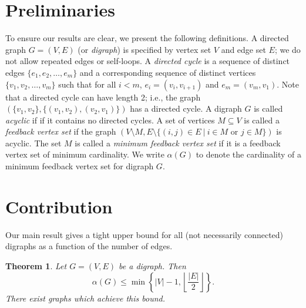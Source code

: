 \documentclass[journal,12pt,onecolumn]{IEEETran}  %
\newtheorem{theorem}{Theorem}[section]
\begin{document}
\section{Preliminaries}
To ensure our results are clear, we present the following definitions.
A directed graph $G=(V,E)$ (or \emph{digraph}) is specified by vertex set $V$ and edge set $E$; we do not allow repeated edges or self-loops.
A \emph{directed cycle} is a sequence of distinct edges $\{e_1,e_2,\ldots,e_m\}$ and a corresponding sequence of distinct vertices $\{v_1,v_2,\ldots,v_m\}$ such that for all $i<m$, $e_i=(v_i,v_{i+1})$ and $e_m=(v_m,v_1)$.
Note that a directed cycle can have length 2; i.e., the graph $(\{v_1,v_2\},\{(v_1,v_2),(v_2,v_1)\})$ has a directed cycle.
A digraph $G$ is called \emph{acyclic} if if it contains no directed cycles.
A set of vertices $M\subseteq V$ is called a \emph{feedback vertex set} if the graph $\left(V\setminus M,E\setminus \{(i,j)\in E\ |\ i\in M \mbox{ or } j\in M\}\right)$ is acyclic.
The set $M$ is called a \emph{minimum feedback vertex set} if it is a feedback vertex set of minimum cardinality. 
We write $\alpha(G)$ to denote the cardinality of a minimum feedback vertex set for digraph $G$.

\section{Contribution}


Our main result gives a tight upper bound for all (not necessarily connected) digraphs as a function of the number of edges.
\begin{theorem}\label{thm:main}
Let $G=(V,E)$ be a digraph.
Then
\begin{equation}\label{eq:main}
\alpha(G) \leq \min\left\{|V|-1,\left\lfloor\frac{|E|}{2}\right\rfloor\right\}.
\end{equation}
There exist graphs which achieve this bound.
\end{theorem}
\end{document}
